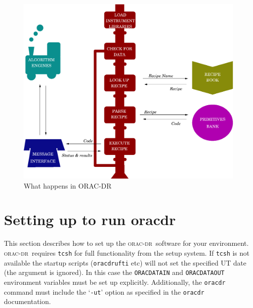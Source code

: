 \documentclass[twoside,11pt]{article}
\renewcommand{\_}{\texttt{\symbol{95}}}
\newcommand{\oracdr}{\textsc{orac-dr}}
\begin{document}
\begin{figure}
\includegraphics[width=\textwidth]{sun230_train.eps}
\caption{What happens in ORAC-DR}
\end{figure}


\section{Setting up to run oracdr\label{Setting_up_to_run_oracdr}}

This section describes how to set up the \oracdr\ software for your
environment. \oracdr\ requires \texttt{tcsh} for full functionality from the
setup system. If \texttt{tcsh} is not available the startup scripts
(\texttt{oracdr\_ufti} etc) will not set the specified UT date (the argument
is ignored). In this case the \texttt{ORAC\_DATA\_IN} and \texttt{ORAC\_DATA\_OUT}
environment variables must be set up explicitly. Additionally, the
\texttt{oracdr} command must include the `\texttt{-ut}' option as specified in the
\texttt{oracdr} documentation.
\end{document}
